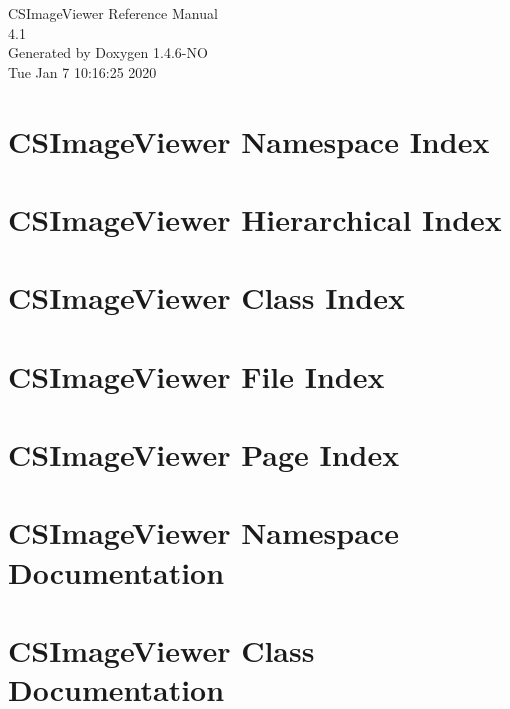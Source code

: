\documentclass[a4paper]{book}
\begin{document}
\begin{titlepage}
\vspace*{7cm}
\begin{center}
{\Large CSImage\-Viewer Reference Manual\\[1ex]\large 4.1 }\\
\vspace*{1cm}
{\large Generated by Doxygen 1.4.6-NO}\\
\vspace*{0.5cm}
{\small Tue Jan 7 10:16:25 2020}\\
\end{center}
\end{titlepage}
\clearemptydoublepage
{}
\tableofcontents
\clearemptydoublepage
{}
\chapter{CSImage\-Viewer Namespace Index}

\chapter{CSImage\-Viewer Hierarchical Index}

\chapter{CSImage\-Viewer Class Index}

\chapter{CSImage\-Viewer File Index}

\chapter{CSImage\-Viewer Page Index}

\chapter{CSImage\-Viewer Namespace Documentation}










\chapter{CSImage\-Viewer Class Documentation}







\end{document}
